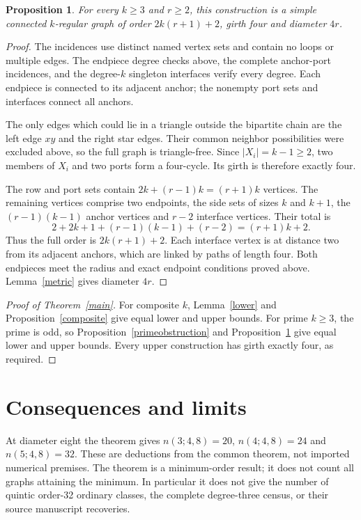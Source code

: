 \documentclass[11pt]{article}
\newtheorem{proposition}[theorem]{Proposition}
\begin{document}
\begin{proposition}\label{plustwo}
For every $k\geq3$ and $r\geq2$, this construction is a simple
connected $k$-regular graph of order $2k(r+1)+2$, girth four and
diameter $4r$.
\end{proposition}
\begin{proof}
The incidences use distinct named vertex sets and contain no loops
or multiple edges. The endpiece degree checks above, the complete
anchor-port incidences, and the degree-$k$ singleton interfaces
verify every degree. Each endpiece is connected to its adjacent
anchor; the nonempty port sets and interfaces connect all anchors.

The only edges which could lie in a triangle outside the bipartite
chain are the left edge $xy$ and the right star edges. Their common
neighbor possibilities were excluded above, so the full graph is
triangle-free. Since $|X_i|=k-1\geq2$, two members of $X_i$ and
two ports form a four-cycle. Its girth is therefore exactly four.

The row and port sets contain $2k+(r-1)k=(r+1)k$ vertices. The
remaining vertices comprise two endpoints, the side sets of sizes
$k$ and $k+1$, the $(r-1)(k-1)$ anchor vertices and $r-2$ interface
vertices. Their total is
\[
 2+2k+1+(r-1)(k-1)+(r-2)=(r+1)k+2.
\]
Thus the full order is $2k(r+1)+2$. Each interface vertex is at
distance two from its adjacent anchors, which are linked by paths
of length four. Both endpieces meet the radius and exact endpoint
conditions proved above. Lemma~\ref{metric} gives diameter $4r$.
\end{proof}

\begin{proof}[Proof of Theorem~\ref{main}]
For composite $k$, Lemma~\ref{lower} and
Proposition~\ref{composite} give equal lower and upper bounds.
For prime $k\geq3$, the prime is odd, so
Proposition~\ref{primeobstruction} and
Proposition~\ref{plustwo} give equal lower and upper bounds.
Every upper construction has girth exactly four, as required.
\end{proof}

\section{Consequences and limits}

At diameter eight the theorem gives $n(3;4,8)=20$,
$n(4;4,8)=24$ and $n(5;4,8)=32$. These are deductions from
the common theorem, not imported numerical premises. The theorem
is a minimum-order result; it does not count all graphs attaining
the minimum. In particular it does not give the number of quintic
order-32 ordinary classes, the complete degree-three census, or
their source manuscript recoveries.
\end{document}
